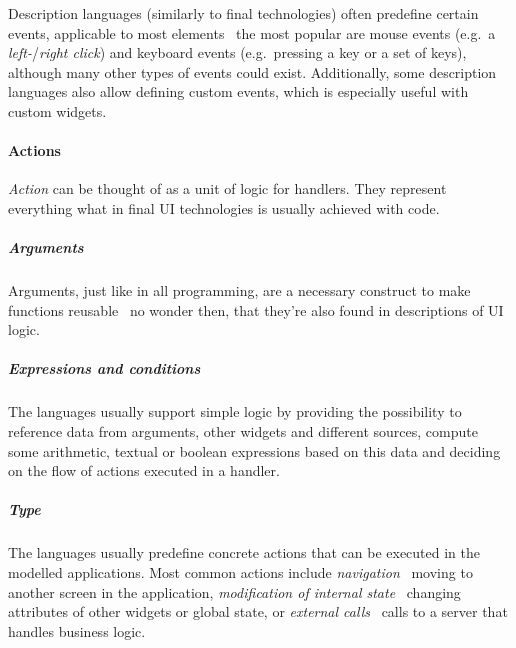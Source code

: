 Description languages (similarly to final technologies) often predefine certain events, applicable to most elements \textendash\ the most popular are mouse events (e.g.\ a \emph{left-}/\emph{right click}) and keyboard events (e.g.\ pressing a key or a set of keys), although many other types of events could exist.
Additionally, some description languages also allow defining custom events, which is especially useful with custom widgets.

\paragraph{Actions}
\emph{Action} can be thought of as a unit of logic for handlers.
They represent everything what in final UI technologies is usually achieved with code.


\subparagraph{Arguments}
Arguments, just like in all programming, are a necessary construct to make functions reusable \textendash\ no wonder then, that they're also found in descriptions of UI logic.

\subparagraph{Expressions and conditions}
The languages usually support simple logic by providing the possibility to reference data from arguments, other widgets and different sources, compute some arithmetic, textual or boolean expressions based on this data and deciding on the flow of actions executed in a handler.

\subparagraph{Type}
The languages usually predefine concrete actions that can be executed in the modelled applications.
Most common actions include \emph{navigation} \textendash\ moving to another screen in the application, \emph{modification of internal state} \textendash\ changing attributes of other widgets or global state, or \emph{external calls} \textendash\ calls to a server that handles business logic.


%

